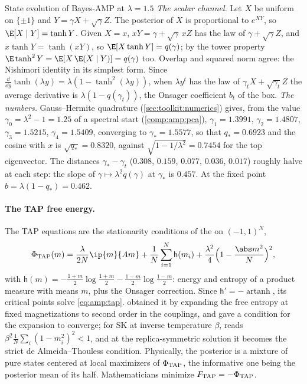 \begin{refsection}
\begin{computation}{State evolution of Bayes-AMP at $\lambda=1.5$}\label{comp:amp:se}
\step \emph{The scalar channel.} Let $X$ be uniform on $\{\pm1\}$ and $Y=\gamma X+\sqrt\gamma Z$. The posterior of $X$ is proportional to $e^{XY}$, so $\E[X\mid Y]=\tanh Y$. Given $X=x$, $xY=\gamma+\sqrt\gamma\,xZ$ has the law of $\gamma+\sqrt\gamma Z$, and $x\tanh Y=\tanh(xY)$, so $\E[X\tanh Y]=q(\gamma)$; by the tower property $\E\tanh^2Y=\E[X\,\E(X\mid Y)]=q(\gamma)$ too. Overlap and squared norm agree: the Nishimori identity in its simplest form. Since $\frac{\dd}{\dd y}\tanh(\lambda y)=\lambda(1-\tanh^2(\lambda y))$, when $\lambda y^t$ has the law of $\gamma_tX+\sqrt{\gamma_t}Z$ the average derivative is $\lambda(1-q(\gamma_t))$, the Onsager coefficient $b_t$ of the box.
\step \emph{The numbers.} Gauss--Hermite quadrature (\cref{sec:toolkit:numerics}) gives, from the value $\gamma_0=\lambda^2-1=1.25$ of a spectral start (\cref{comp:amp:pca}), $\gamma_1=1.3991$, $\gamma_2=1.4807$, $\gamma_3=1.5215$, $\gamma_4=1.5409$, converging to $\gamma_*=1.5577$, so that $q_*=0.6923$ and the cosine with $x$ is $\sqrt{q_*}=0.8320$, against $\sqrt{1-1/\lambda^2}=0.7454$ for the top eigenvector. The distances $\gamma_*-\gamma_t$ ($0.308$, $0.159$, $0.077$, $0.036$, $0.017$) roughly halve at each step: the slope of $\gamma\mapsto\lambda^2q(\gamma)$ at $\gamma_*$ is $0.457$. At the fixed point $b=\lambda(1-q_*)=0.462$.
\end{computation}

\paragraph{The TAP free energy.} The TAP equations are the stationarity conditions of the  on $(-1,1)^N$,
\[
\Phi_{\ampTAP}(m)=\frac\lambda{2N}\ip{m}{Am}+\frac1N\sum_{i=1}^N\mathsf h(m_i)+\frac{\lambda^2}4\Bigl(1-\frac{\abs m^2}N\Bigr)^2,
\]
with $\mathsf h(m)=-\frac{1+m}2\log\frac{1+m}2-\frac{1-m}2\log\frac{1-m}2$: energy and entropy of a product measure with means $m$, plus the Onsager correction. Since $\mathsf h'=-\operatorname{artanh}$, its critical points solve \eqref{eq:amp:tap}. \Textcite{Plefka1982} obtained it by expanding the free entropy at fixed magnetizations to second order in the couplings, and gave a condition for the expansion to converge; for SK at inverse temperature $\beta$,  reads $\beta^2\frac1N\sum_i(1-m_i^2)^2<1$, and at the replica-symmetric solution it becomes the strict de Almeida--Thouless condition. Physically, the posterior is a mixture of pure states centered at local maximizers of $\Phi_{\mathrm{TAP}}$, the informative one being the posterior mean of its half. Mathematicians minimize $F_{\mathrm{TAP}}=-\Phi_{\mathrm{TAP}}$.


\end{refsection}
